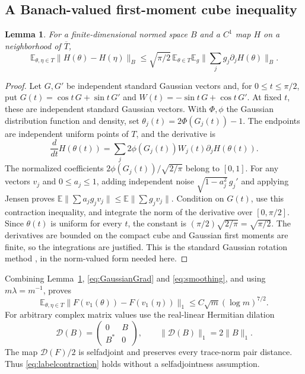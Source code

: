 \documentclass[11pt]{article}
\newtheorem{lemma}[theorem]{Lemma}
\theoremstyle{remark}\newtheorem{remark}[theorem]{Remark}
\numberwithin{equation}{section}
\newcommand{\E}{\mathbb E}\newcommand{\Prob}{\mathbb P}
\newcommand{\norm}[1]{\lVert #1\rVert}
\begin{document}
\subsection{A Banach-valued first-moment cube inequality}
\begin{lemma}\label{lem:cube}
For a finite-dimensional normed space $B$ and a $C^1$ map $H$ on a
neighborhood of $\overline T$,
\[
 \E_{\theta,\eta\in T}\norm{H(\theta)-H(\eta)}_B
 \le\sqrt{\pi/2}\,
       \E_{\theta\in T}\E_g\norm{\sum_jg_j\partial_jH(\theta)}_B.
\]
\end{lemma}
\begin{proof}
Let $G,G'$ be independent standard Gaussian vectors and, for
$0\le t\le\pi/2$, put $G(t)=\cos t\,G+\sin t\,G'$ and
$W(t)=-\sin t\,G+\cos t\,G'$. At fixed $t$, these are independent
standard Gaussian vectors. With $\Phi,\phi$ the Gaussian distribution
function and density, set $\theta_j(t)=2\Phi(G_j(t))-1$. The endpoints
are independent uniform points of $T$, and the derivative is
\[
 \frac d{dt}H(\theta(t))
 =\sum_j2\phi(G_j(t))W_j(t)\partial_jH(\theta(t)).
\]
The normalized coefficients $2\phi(G_j(t))/\sqrt{2/\pi}$ belong to
$[0,1]$. For any vectors $v_j$ and $0\le a_j\le1$, adding independent
noise $\sqrt{1-a_j^2}\,g_j'$ and applying Jensen proves
$\E\norm{\sum a_jg_jv_j}\le\E\norm{\sum g_jv_j}$.
Condition on $G(t)$, use this contraction inequality, and integrate the
norm of the derivative over $[0,\pi/2]$. Since $\theta(t)$ is uniform
for every $t$, the constant is $(\pi/2)\sqrt{2/\pi}=\sqrt{\pi/2}$.
The derivatives are bounded on the compact cube and Gaussian first
moments are finite, so the integrations are justified. This is the
standard Gaussian rotation method \cite{Pisier}, in the norm-valued form
needed here.
\end{proof}
Combining Lemma~\ref{lem:cube}, \eqref{eq:GaussianGrad} and
\eqref{eq:smoothing}, and using $m\lambda=m^{-1}$, proves
\begin{equation}\label{eq:labelcontraction}
 \E_{\theta,\eta\in T}
 \norm{F(v_1(\theta))-F(v_1(\eta))}_1
 \le C\sqrt m(\log m)^{7/2}.
\end{equation}
For arbitrary complex matrix values use the real-linear Hermitian dilation
\[
 \mathcal D(B)=\begin{pmatrix}0&B\\ B^*&0\end{pmatrix},
 \qquad \norm{\mathcal D(B)}_1=2\norm B_1.
\]
The map $\mathcal D(F)/2$ is selfadjoint and preserves every trace-norm
pair distance. Thus \eqref{eq:labelcontraction} holds without a
selfadjointness assumption.
\end{document}
